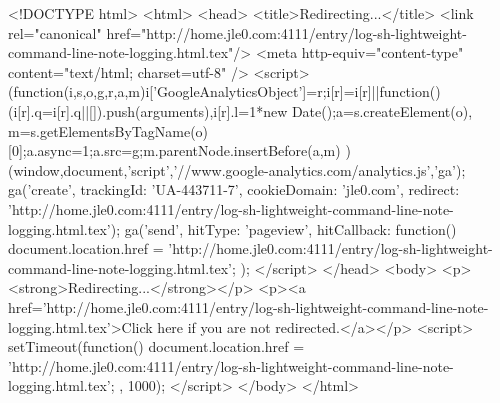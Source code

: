 <!DOCTYPE html>
<html>
<head>
<title>Redirecting...</title>
<link rel="canonical" href="http://home.jle0.com:4111/entry/log-sh-lightweight-command-line-note-logging.html.tex"/>
<meta http-equiv="content-type" content="text/html; charset=utf-8" />
<script>
(function(i,s,o,g,r,a,m){i['GoogleAnalyticsObject']=r;i[r]=i[r]||function(){
(i[r].q=i[r].q||[]).push(arguments)},i[r].l=1*new Date();a=s.createElement(o),
m=s.getElementsByTagName(o)[0];a.async=1;a.src=g;m.parentNode.insertBefore(a,m)
})(window,document,'script','//www.google-analytics.com/analytics.js','ga');
ga('create', { trackingId: 'UA-443711-7', cookieDomain: 'jle0.com', redirect: 'http://home.jle0.com:4111/entry/log-sh-lightweight-command-line-note-logging.html.tex'});
ga('send', { hitType: 'pageview', hitCallback: function() { document.location.href = 'http://home.jle0.com:4111/entry/log-sh-lightweight-command-line-note-logging.html.tex'; } });
</script>
</head>
<body>
  <p><strong>Redirecting...</strong></p>
  <p><a href='http://home.jle0.com:4111/entry/log-sh-lightweight-command-line-note-logging.html.tex'>Click here if you are not redirected.</a></p>
  <script>
    setTimeout(function() { document.location.href = 'http://home.jle0.com:4111/entry/log-sh-lightweight-command-line-note-logging.html.tex'; }, 1000);
  </script>
</body>
</html>
